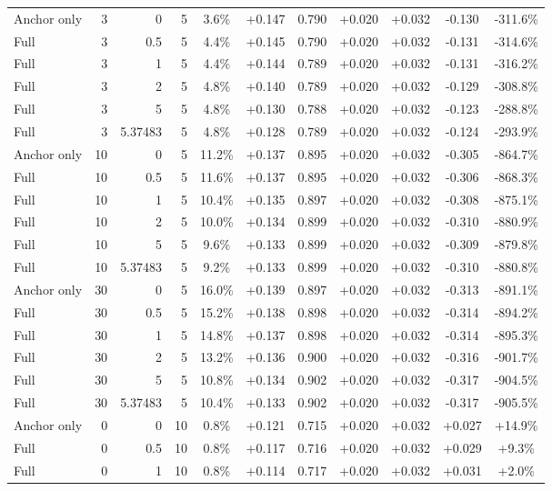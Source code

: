 \begin{table}[htbp]
\begin{tabular}{lrrrccccccc}
Anchor only & 3 & 0 & 5 & 3.6\% & +0.147 & 0.790 & +0.020 & +0.032 & -0.130 & -311.6\% \\
Full & 3 & 0.5 & 5 & 4.4\% & +0.145 & 0.790 & +0.020 & +0.032 & -0.131 & -314.6\% \\
Full & 3 & 1 & 5 & 4.4\% & +0.144 & 0.789 & +0.020 & +0.032 & -0.131 & -316.2\% \\
Full & 3 & 2 & 5 & 4.8\% & +0.140 & 0.789 & +0.020 & +0.032 & -0.129 & -308.8\% \\
Full & 3 & 5 & 5 & 4.8\% & +0.130 & 0.788 & +0.020 & +0.032 & -0.123 & -288.8\% \\
Full & 3 & 5.37483 & 5 & 4.8\% & +0.128 & 0.789 & +0.020 & +0.032 & -0.124 & -293.9\% \\
Anchor only & 10 & 0 & 5 & 11.2\% & +0.137 & 0.895 & +0.020 & +0.032 & -0.305 & -864.7\% \\
Full & 10 & 0.5 & 5 & 11.6\% & +0.137 & 0.895 & +0.020 & +0.032 & -0.306 & -868.3\% \\
Full & 10 & 1 & 5 & 10.4\% & +0.135 & 0.897 & +0.020 & +0.032 & -0.308 & -875.1\% \\
Full & 10 & 2 & 5 & 10.0\% & +0.134 & 0.899 & +0.020 & +0.032 & -0.310 & -880.9\% \\
Full & 10 & 5 & 5 & 9.6\% & +0.133 & 0.899 & +0.020 & +0.032 & -0.309 & -879.8\% \\
Full & 10 & 5.37483 & 5 & 9.2\% & +0.133 & 0.899 & +0.020 & +0.032 & -0.310 & -880.8\% \\
Anchor only & 30 & 0 & 5 & 16.0\% & +0.139 & 0.897 & +0.020 & +0.032 & -0.313 & -891.1\% \\
Full & 30 & 0.5 & 5 & 15.2\% & +0.138 & 0.898 & +0.020 & +0.032 & -0.314 & -894.2\% \\
Full & 30 & 1 & 5 & 14.8\% & +0.137 & 0.898 & +0.020 & +0.032 & -0.314 & -895.3\% \\
Full & 30 & 2 & 5 & 13.2\% & +0.136 & 0.900 & +0.020 & +0.032 & -0.316 & -901.7\% \\
Full & 30 & 5 & 5 & 10.8\% & +0.134 & 0.902 & +0.020 & +0.032 & -0.317 & -904.5\% \\
Full & 30 & 5.37483 & 5 & 10.4\% & +0.133 & 0.902 & +0.020 & +0.032 & -0.317 & -905.5\% \\
Anchor only & 0 & 0 & 10 & 0.8\% & +0.121 & 0.715 & +0.020 & +0.032 & +0.027 & +14.9\% \\
Full & 0 & 0.5 & 10 & 0.8\% & +0.117 & 0.716 & +0.020 & +0.032 & +0.029 & +9.3\% \\
Full & 0 & 1 & 10 & 0.8\% & +0.114 & 0.717 & +0.020 & +0.032 & +0.031 & +2.0\% \\

\end{tabular}
\end{table}
